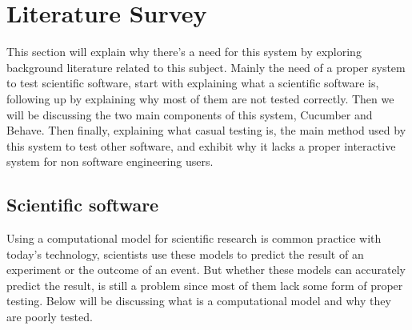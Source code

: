 \chapter{Literature Survey}

This section will explain why there’s a need for this system by exploring background literature related to this subject. Mainly the need of a proper system to test scientific software, start with explaining what a scientific software is, following up by explaining why most of them are not tested correctly. Then we will be discussing the two main components of this system, Cucumber and Behave. Then finally, explaining what casual testing is, the main method used by this system to test other software, and exhibit why it lacks a proper interactive system for non software engineering users.

\section{Scientific software}
Using a computational model for scientific research is common practice with today’s technology, scientists use these models to predict the result of an experiment or the outcome of an event. But whether these models can accurately predict the result, is still a problem since most of them lack some form of proper testing. Below will be discussing what is a computational model and why they are poorly tested.

